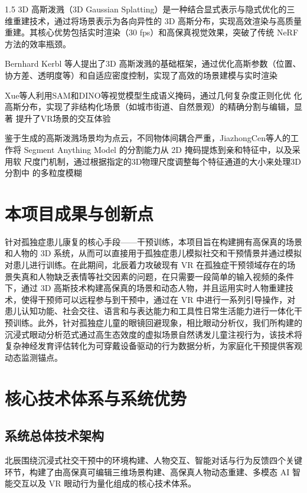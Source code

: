 \documentclass[zihao=-4]{ctexart}
\begin{document}
\begin{spacing}{1.5}
3D 高斯泼溅（3D Gaussian Splatting）是一种结合显式表示与隐式优化的三维重建技术，通过将场景表示为各向异性的 3D 高斯分布，实现高效渲染与高质量重建。其核心优势包括实时渲染（30 fps）和高保真视觉效果，突破了传统 NeRF 方法的效率瓶颈\cite{ref27}。

Bernhard Kerbl 等人提出了3D 高斯泼溅的基础框架，通过优化高斯参数（位置、 协方差、透明度等）和自适应密度控制，实现了高效的场景建模与实时渲染\cite{ref15}

Xue等人利用SAM和DINO等视觉模型生成语义掩码，通过几何复杂度正则化优 化高斯分布，实现了非结构化场景（如城市街道、自然景观）的精确分割与编辑，显著 提升了VR场景的交互体验\cite{ref28}

鉴于生成的高斯泼溅场景均为点云，不同物体间耦合严重，JiazhongCen等人的工 作将 Segment Anything Model 的分割能力从 2D 掩码提炼到亲和特征中，以及采用软 尺度门机制，通过根据指定的3D物理尺度调整每个特征通道的大小来处理3D分割中 的多粒度模糊\cite{ref29,ref30}


\section{本项目成果与创新点}

针对孤独症患儿康复的核心手段——干预训练，本项目旨在构建拥有高保真的场景和人物的 3D 系统，从而可以直接用于孤独症患儿模拟社交和干预情景并通过模拟对患儿进行训练。在此期间，北辰着力攻破现有 VR 在孤独症干预领域存在的场景失真和人物缺乏表情等社交因素的问题，在只需要一段简单的输入视频的条件下，通过 3D 高斯技术构建高保真的场景和动态人物，并且运用实时人物重建技术，使得干预师可以远程参与到干预中，通过在 VR 中进行一系列引导操作，对患儿认知功能、社会交往、语言和与表达能力和工具性日常生活能力进行一体化干预训练。此外，针对孤独症儿童的眼镜回避现象，相比眼动分析仪，我们所构建的沉浸式眼动分析范式通过高生态效度的虚拟场景自然诱发儿童注视行为，该技术将复杂神经发育评估转化为可穿戴设备驱动的行为数据分析，为家庭化干预提供客观动态监测锚点。

\section{核心技术体系与系统优势}

\subsection{系统总体技术架构}



北辰围绕沉浸式社交干预中的环境构建、人物交互、智能对话与行为反馈四个关键环节，构建了由高保真可编辑三维场景构建、高保真人物动态重建、多模态 AI 智能交互以及 VR 眼动行为量化组成的核心技术体系。


\end{spacing}
\end{document}

